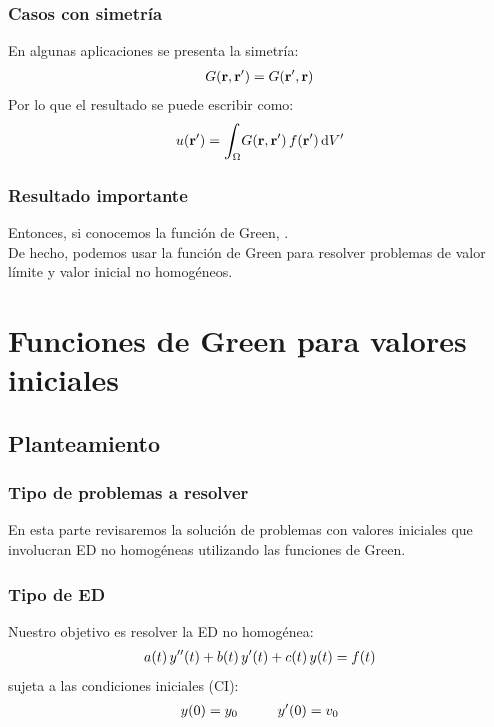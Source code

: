 \documentclass[12pt]{beamer}
\begin{document}
\begin{frame}
\frametitle{Casos con simetría}
En algunas aplicaciones se presenta la simetría:
\pause
\begin{align*}
G (\vb{r}, \vb{\ensuremath{{r}^{\prime}}}) = G (\vb{\ensuremath{{r}^{\prime}}}, \vb{r})
\end{align*}
\pause
Por lo que el resultado se puede escribir como:
\pause
\begin{align*}
u (\vb{\pderivada{r}}) = \scaleint{6ex}_{\bs \Omega} G (\vb{r}, \vb{\pderivada{r}}) \, f (\vb{\pderivada{r}}) \dd{\pderivada{V}}
\end{align*}
\end{frame}

\begin{frame}
\frametitle{Resultado importante}
Entonces, si conocemos la función de Green, \pause {}.
\\
\bigskip
\pause
De hecho, podemos usar la función de Green para resolver problemas de valor límite y valor inicial no homogéneos.
\end{frame}

\section{Funciones de Green para valores iniciales}
\subsection{Planteamiento}

\begin{frame}
\frametitle{Tipo de problemas a resolver}
En esta parte revisaremos la solución de problemas con valores iniciales que involucran ED no homogéneas utilizando las funciones de Green.
\end{frame}

\begin{frame}
\frametitle{Tipo de ED}
Nuestro objetivo es resolver la ED no homogénea:
\pause
\begin{align}
a (t) \, {y}^{\prime \prime} (t) + b (t) \, {y}^{\prime} (t) + c (t) \, y (t) = f (t)
\label{eq:ecuacion_07_04}
\end{align}
\pause
sujeta a las condiciones iniciales (CI):
\pause
\begin{align*}
y (0) = y_{0} \hspace{1cm} {y}^{\prime} (0) = v_{0}
\end{align*}
\end{frame}
\end{document}
